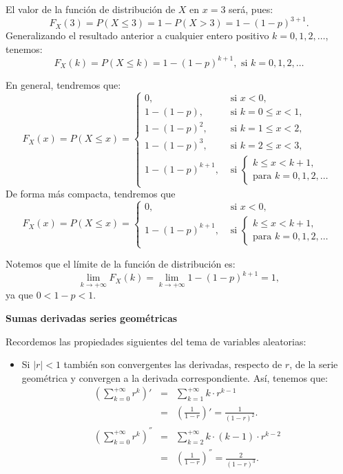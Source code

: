 \documentclass[]{book}
\providecommand{\tightlist}{%
  \setlength{\itemsep}{0pt}\setlength{\parskip}{0pt}}
\begin{document}
El valor de la función de distribución de \(X\) en \(x=3\) será, pues:
\[F_X(3)=P(X\leq 3)=1-P(X>3)=1-(1-p)^{3+1}.\]
Generalizando el resultado anterior a cualquier entero positivo \(k=0,1,2,\ldots\), tenemos:
\[F_X(k)=P(X\leq k)=1-(1-p)^{k+1},\mbox{ si } k=0,1,2,\ldots\]

En general, tendremos que:
\[
F_X(x)=P(X\leq x)=
\left\{\begin{array}{ll} 
0, & \mbox{ si } x<0,\\
1- (1-p),  & \mbox{ si } k=0\leq x <1,\\
1- (1-p)^2, & \mbox{ si } k=1\leq x <2,\\
1- (1-p)^3, & \mbox{ si } k=2\leq x <3,\\
1- (1-p)^{k+1}, & \mbox{ si } \left\{ \begin{array}{l}k\leq x< k+1,\\\mbox{para } k=0,1,2,\ldots\end{array}
    \right.\end{array}\right.
\]
De forma más compacta, tendremos que
\[
F_X(x)=P(X\leq x)=
\left\{\begin{array}{ll} 
0, & \mbox{ si } x<0,\\
1- (1-p)^{k+1}, & \mbox{ si } \left\{ \begin{array}{l}k\leq x< k+1,\\\mbox{para } k=0,1,2,\ldots\end{array}
    \right.\end{array}
    \right.
\]

Notemos que el límite de la función de distribución es:
\[
\displaystyle\lim_{k\to +\infty } F_X(k)=\lim_{k\to +\infty } 1-(1-p)^{k+1}=
1,
\]
ya que \(0<1-p<1\).

\textbf{Sumas derivadas series geométricas}

Recordemos las propiedades siguientes del tema de variables aleatorias:

\begin{itemize}
\tightlist
\item
  Si \(|r|<1\) también son convergentes las derivadas, respecto de \(r\), de la serie geométrica y convergen a la derivada correspondiente. Así, tenemos que:
  \begin{eqnarray*}
  \left(\sum_{k=0}^{+\infty} r^k\right)' &=& \sum_{k=1}^{+\infty}k\cdot
  r^{k-1}\\
  &=& \left(\frac{1}{1-r}\right)'=\frac{1}{(1-r)^2}.\\
  \left(\sum_{k=0}^{+\infty} r^k\right)^{''} &=& \sum_{k=2}^{+\infty}k \cdot(k-1)\cdot r^{k-2} \\
  &=& \left(\frac{1}{1-r}\right)^{''}=\frac{2}{(1-r)^3}.
  \end{eqnarray*}
\end{itemize}
\end{document}
